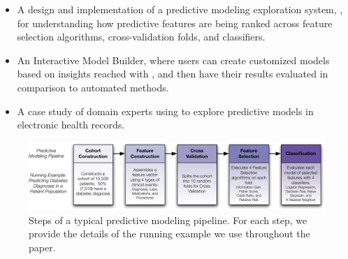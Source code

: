 \begin{itemize}
\item A design and implementation of a predictive modeling exploration system,
\infuse, for understanding how predictive features are being ranked
across feature selection algorithms, cross-validation folds, and classifiers.
\item An Interactive Model Builder, where users can create customized models based on insights reached with \infuse, and then have their results evaluated in comparison to automated methods.
\item A case study of domain experts using
\infuse  to explore predictive models in electronic health records.
\end{itemize}

\begin{figure}[t]
\centering
\includegraphics[width=\linewidth]{infuse/pipeline}
\caption[Steps of a typical predictive modeling pipeline.]{Steps of a typical predictive modeling pipeline.  For each step, we provide the details of the running example we use throughout the paper.
}
\label{fig:pipeline}
\end{figure}

